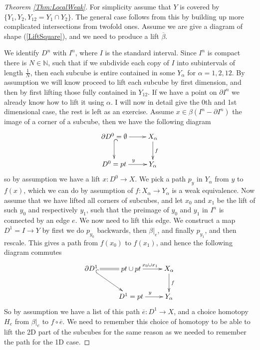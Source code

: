 \documentclass{article}
\newtheorem{proposed work}[theorem]{Proposed Work}
\newcommand{\xymat}[1]{\begin{align*}\xymatrix{ #1}\end{align*}}
\begin{document}
\begin{proof}[Theorem \ref{Thm:LocalWeak}]
For simplicity assume that $Y$ is covered by $\{Y_1,Y_2,Y_{12}=Y_1\cap Y_2\}$. The general case follows from this by building up more complicated intersections from twofold ones. Assume we are give a diagram of shape (\ref{LiftSquare}), and we need to produce a lift $\overline{\beta}$. 

We identify $D^n$ with $I^n$, where $I$ is the standard interval. Since $I^n$ is compact there is $N\in \mathbb{N}$, such that if we subdivide each copy of $I$ into subintervals of length $\frac{1}{N}$, then each subcube is entire contained in some $Y_\alpha$ for $\alpha=1,2,12$. By assumption we will know proceed to lift each subcube by first dimension, and then by first lifting those fully contained in $Y_{12}$. If we have a point on $\partial I^n$ we already know how to lift it using $\alpha$. I will now in detail give the 0th and 1st dimensional case, the rest is left as an exercise. Assume $x\in \beta(I^n-\partial I^n)$ the image of a corner of a subcube, then we have the following diagram
\xymat{\partial D^0 =\emptyset \ar[r] \ar@{^{(}->}[d] & X_\alpha \ar[d]^f \\ D^0=pt \ar[r]^y & Y_\alpha }
so by assumption we have a lift $x:D^0 \to X$. We pick a path $p_y$ in $Y_\alpha$ from  $y$ to $f(x)$, which we can do by assumption of $f:X_\alpha \to Y_\alpha$ is a weak equivalence. Now assume that we have lifted all corners of subcubes, and let $x_0$ and $x_1$ be the lift of such $y_0$ and respectively $y_1$, such that the preimage of $y_0$ and $y_1$ in $I^n$ is connected by an edge $e$. We now need to lift this edge. We construct a map $D^1=I \to Y$ by first we do $p_{y_0}$ backwards, then $\beta|_e$, and finally $p_{y_1}$, and then rescale. This gives a path from $f(x_0)$ to $f(x_1)$, and hence the following diagram commutes
\xymat{\partial D^1 \ar@{=}[r]\ar@{^{(}->}[dr]& pt \cup pt \ar[r]^{x_0 \cup x_1}  & X_\alpha \ar[d]^f \\ & D^1=pt \ar[r]^y & Y_\alpha}
So by assumption we have a list of this path $\overline{e}: D^1\to X$, and a choice homotopy $H_e$ from $\beta|_e$ to $f\circ \overline{e}$. We need to remember this choice of homotopy to be able to lift the 2D part of the subcubes for the same reason as we needed to remember the path for the 1D case.
\end{proof}
\printbibliography
\end{document}
